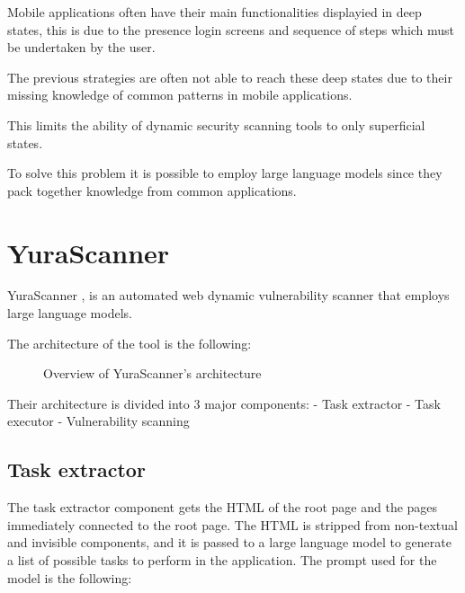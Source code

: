 Mobile applications often have their main functionalities displayied in
deep states, this is due to the presence login screens and sequence of
steps which must be undertaken by the user.

The previous strategies are often not able to reach these deep states
due to their missing knowledge of common patterns in mobile
applications.

This limits the ability of dynamic security scanning tools to only
superficial states.

To solve this problem it is possible to employ large language models
since they pack together knowledge from common applications.

\section{YuraScanner}\label{yurascanner}

YuraScanner \autocite{yurascanner}, is an automated web dynamic
vulnerability scanner that employs large language models.

The architecture of the tool is the following:

\begin{figure}
\centering
{}
\caption{Overview of YuraScanner's architecture}
\end{figure}

Their architecture is divided into 3 major components: - Task extractor
- Task executor - Vulnerability scanning

\subsection{Task extractor}\label{task-extractor}

The task extractor component gets the HTML of the root page and the
pages immediately connected to the root page. The HTML is stripped from
non-textual and invisible components, and it is passed to a large
language model to generate a list of possible tasks to perform in the
application. The prompt used for the model is the following:

